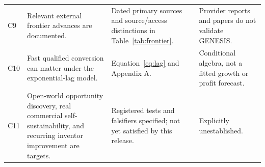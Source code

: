 \documentclass[11pt,letterpaper]{article}
\theoremstyle{remark}\newtheorem{remark}{Remark}[section]
\begin{document}
\begin{longtable}{P{.8cm}P{4.3cm}P{6.0cm}P{4.0cm}}
C9 & Relevant external frontier advances are documented. & Dated primary sources and source/access distinctions in Table~\ref{tab:frontier}. & Provider reports and papers do not validate GENESIS.\\
C10 & Fast qualified conversion can matter under the exponential-lag model. & Equation~\eqref{eq:lag} and Appendix A. & Conditional algebra, not a fitted growth or profit forecast.\\
C11 & Open-world opportunity discovery, real commercial self-sustainability, and recurring inventor improvement are targets. & Registered tests and falsifiers specified; not yet satisfied by this release. & Explicitly unestablished.\\
\bottomrule
\end{longtable}
\normalsize

\clearpage
\small
\raggedright
\setlength{\bibsep}{6pt plus 1pt}


\end{document}
